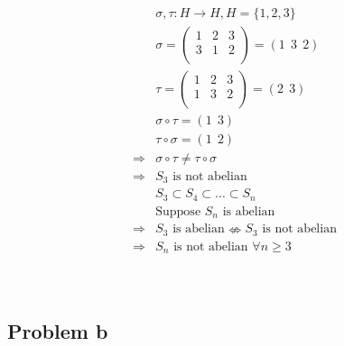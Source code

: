 \documentclass{article}
\begin{document}
~

\begin{equation*}
    \begin{split}
        &\sigma ,\tau:H\rightarrow H,H=\{1,2,3\}\\
        &\sigma=\begin{pmatrix}
            1&2&3\\
            3&1&2\\
        \end{pmatrix}=(1\ \ 3\ \ 2)\\
        &\tau=\begin{pmatrix}
            1&2&3\\
            1&3&2\\
        \end{pmatrix}=(2\ \ 3)\\
        &\sigma\circ\tau=(1\ \ 3)\\
        &\tau\circ\sigma=(1\ \ 2)\\
        \Rightarrow&\sigma\circ\tau\ne \tau\circ\sigma\\
        \Rightarrow&S_3\text{ is not abelian}\\
        &S_3\subset S_4 \subset ...\subset S_n\\
        &\text{Suppose }S_n\text{ is abelian}\\
        \Rightarrow&S_3\text{ is abelian}\nLeftrightarrow S_3\text{ is not abelian}\\
        \Rightarrow&S_n\text{ is not abelian }\forall n\geqslant 3\\
    \end{split}
\end{equation*}

~

\subsection*{Problem b}

~
\end{document}
